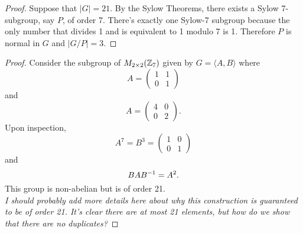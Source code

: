 \documentclass[../AlgebraQualSolutions.tex]{subfiles}
\begin{document}
	\begin{proof}
	Suppose that $|G| = 21$. By the Sylow Theorems, there exists a Sylow 7-subgroup, say $P$, of order 7. There's exactly one Sylow-7 subgroup because the only number that divides 1 and is equivalent to 1 modulo 7 is 1. Therefore $P$ is normal in $G$ and $|G/P| = 3$.
	\end{proof}
	
	\begin{proof}
	Consider the subgroup of $M_{2\times2}(\mathbb{Z}_7)$ given by $G = \langle A, B \rangle$ where
		\[ A = \begin{pmatrix}
		1 & 1 \\
		0 & 1 \end{pmatrix} \]
	and
		\[ A = \begin{pmatrix}
		4 & 0 \\
		0 & 2 \end{pmatrix}. \]
	Upon inspection, 
		\[ A^7 = B^3 = \begin{pmatrix} 1 & 0 \\ 0 & 1 \end{pmatrix} \]
	and
		\[BAB^{-1} = A^2. \]
	This group is non-abelian but is of order 21.\\
	
	\emph{I should probably add more details here about why this construction is guaranteed to be of order 21. It's clear there are at most 21 elements, but how do we show that there are no duplicates?}
	\end{proof}
\end{document}
